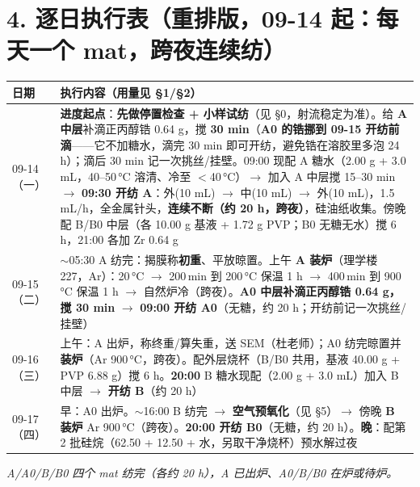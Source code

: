 \documentclass[a4paper, 10pt]{ctexart}
\begin{document}
\section*{4. 逐日执行表（重排版，09-14 起：每天一个 mat，跨夜连续纺）}
\begin{tabular}{p{2.6cm} p{13.2cm}}
\toprule
日期 & 执行内容（用量见 §1/§2） \\
\midrule
09-14（一） & \textbf{进度起点}：\textbf{先做停置检查 + 小样试纺}（见 §0，射流稳定为准）。给 \textbf{A 中层}补滴正丙醇锆 0.64 g，搅 \textbf{30 min}（\textbf{A0 的锆挪到 09-15 开纺前滴}——它不加糖水，滴完 30 min 即可开纺，避免锆在溶胶里多泡 24 h）；滴后 30 min 记一次挑丝/挂壁。09:00 现配 A 糖水（2.00 g + 3.0 mL，40--50\,°C 溶清、冷至 $<$40\,°C）$\rightarrow$ 加入 A 中层搅 15--30 min $\rightarrow$ \textbf{09:30 开纺 A}：外(10 mL) $\rightarrow$ 中(10 mL) $\rightarrow$ 外(10 mL)，1.5 mL/h，全金属针头，\textbf{连续不断（约 20 h，跨夜）}，硅油纸收集。傍晚配 B/B0 中层（各 10.00 g 基液 + 1.72 g PVP；B0 无糖无水）搅 6 h，21:00 各加 Zr 0.64 g \\
09-15（二） & $\sim$05:30 A 纺完：揭膜称\textbf{初重}、平放晾置。上午 \textbf{A 装炉}（理学楼 227，Ar）：20\,°C $\rightarrow$ 200\,min 到 200\,°C 保温 1 h $\rightarrow$ 400\,min 到 900\,°C 保温 1 h $\rightarrow$ 自然炉冷（跨夜）。\textbf{A0 中层补滴正丙醇锆 0.64 g，搅 30 min} $\rightarrow$ \textbf{09:00 开纺 A0}（无糖，约 20 h；开纺前记一次挑丝/挂壁） \\
09-16（三） & 上午：A 出炉，称终重/算失重，送 SEM（杜老师）；A0 纺完晾置并\textbf{装炉}（Ar 900\,°C，跨夜）。配外层烧杯（B/B0 共用，基液 40.00 g + PVP 6.88 g）搅 6 h。\textbf{20:00} B 糖水现配（2.00 g + 3.0 mL）加入 B 中层 $\rightarrow$ \textbf{开纺 B}（约 20 h） \\
09-17（四） & 早：A0 出炉。$\sim$16:00 B 纺完 $\rightarrow$ \textbf{空气预氧化}（见 §5）$\rightarrow$ 傍晚 \textbf{B 装炉} Ar 900\,°C（跨夜）。\textbf{20:00 开纺 B0}（无糖，约 20 h）。\textbf{晚}：配第 2 批硅烷（62.50 + 12.50 + 水，另取干净烧杯）预水解过夜 \\
\bottomrule
\end{tabular}

{\small\itshape A/A0/B/B0 四个 mat 纺完（各约 20 h），A 已出炉、A0/B/B0 在炉或待炉。}
\end{document}
